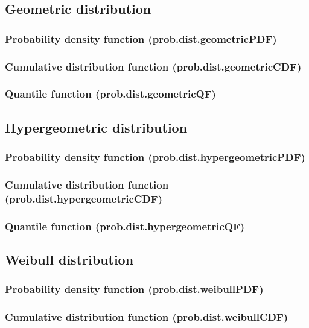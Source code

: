 \documentclass{article}
\theoremstyle{definition}
\begin{document}
\subsection{Geometric distribution}
\subsubsection{Probability density function (prob.dist.geometricPDF)}
\subsubsection{Cumulative distribution function (prob.dist.geometricCDF)}
\subsubsection{Quantile function (prob.dist.geometricQF)}

\subsection{Hypergeometric distribution}
\subsubsection{Probability density function (prob.dist.hypergeometricPDF)}
\subsubsection{Cumulative distribution function (prob.dist.hypergeometricCDF)}
\subsubsection{Quantile function (prob.dist.hypergeometricQF)}

\subsection{Weibull distribution}
\subsubsection{Probability density function (prob.dist.weibullPDF)}
\subsubsection{Cumulative distribution function (prob.dist.weibullCDF)}
\end{document}
